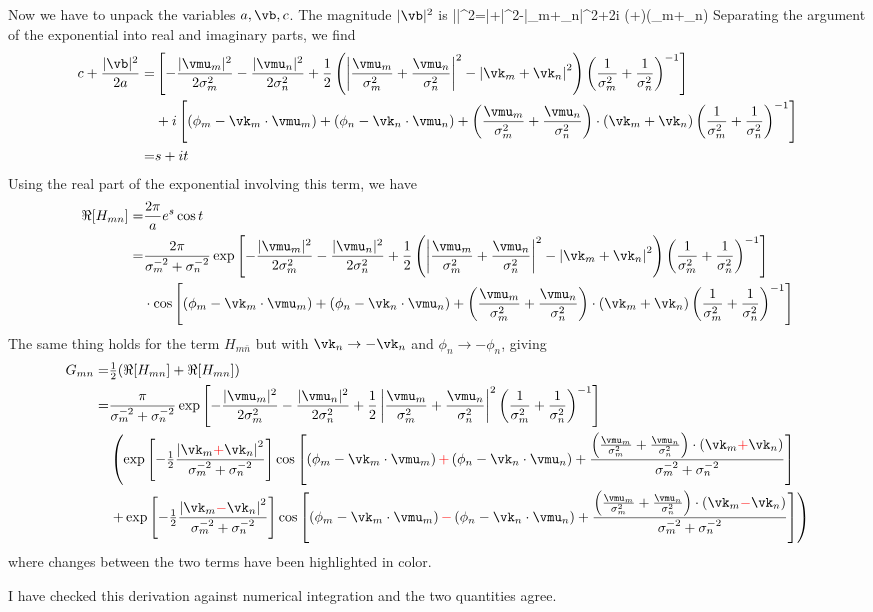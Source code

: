 \documentclass[12pt]{article}
\begin{document}
Now we have to unpack the variables $a,\vb,c$. The magnitude $|\vb|^2$ is
\be
|\vb|^2=\left|+\right|^2-\left|\vk_m+\vk_n\right|^2+2i \left(+\right)\cdot\left(\vk_m+\vk_n\right)
\ee
Separating the argument of the exponential into real and imaginary parts, we find
\begin{align}
c+\frac{|\vb|^2}{2a}=&\left[-\frac{|\vmu_m|^2}{2\sigma_m^2}-\frac{|\vmu_n|^2}{2\sigma_n^2}
+\frac{1}{2}\left(\left|\frac{\vmu_m}{\sigma_m^2}+\frac{\vmu_n}{\sigma_n^2}\right|^2
-\left|\vk_m+\vk_n\right|^2\right)\left(\frac{1}{\sigma_m^2}+\frac{1}{\sigma_n^2}\right)^{-1}\right]\\
&+i\left[\left(\phi_m-\vk_m\cdot\vmu_m\right)+\left(\phi_n-\vk_n\cdot\vmu_n\right)+\left(\frac{\vmu_m}{\sigma_m^2}+\frac{\vmu_n}{\sigma_n^2}\right)\cdot\left(\vk_m+\vk_n\right)\left(\frac{1}{\sigma_m^2}+\frac{1}{\sigma_n^2}\right)^{-1}\right]\\
=&s+it
\end{align}
Using the real part of the exponential involving this term, we have
\begin{align}
\Re[H_{mn}]=&\frac{2\pi}{a}e^s\cos{t}\\
=&\frac{2\pi}{\sigma_m^{-2}+\sigma_n^{-2}}\exp{\left[-\frac{|\vmu_m|^2}{2\sigma_m^2}-\frac{|\vmu_n|^2}{2\sigma_n^2}
+\frac{1}{2}\left(\left|\frac{\vmu_m}{\sigma_m^2}+\frac{\vmu_n}{\sigma_n^2}\right|^2
-\left|\vk_m+\vk_n\right|^2\right)\left(\frac{1}{\sigma_m^2}+\frac{1}{\sigma_n^2}\right)^{-1}\right]}\\
&\cdot\cos{\left[\left(\phi_m-\vk_m\cdot\vmu_m\right)+\left(\phi_n-\vk_n\cdot\vmu_n\right)+\left(\frac{\vmu_m}{\sigma_m^2}+\frac{\vmu_n}{\sigma_n^2}\right)\cdot\left(\vk_m+\vk_n\right)\left(\frac{1}{\sigma_m^2}+\frac{1}{\sigma_n^2}\right)^{-1}\right]}
\end{align}
The same thing holds for the term $H_{m\bar{n}}$ but with $\vk_n\to-\vk_n$ and $\phi_n\to-\phi_n$, giving
\begin{align}
G_{mn}=&\tfrac{1}{2}(\Re[H_{mn}]+\Re[H_{mn}])\\
=&\frac{\pi}{\sigma_m^{-2}+\sigma_n^{-2}}\exp{\left[-\frac{|\vmu_m|^2}{2\sigma_m^2}-\frac{|\vmu_n|^2}{2\sigma_n^2}
+\frac{1}{2}\left|\frac{\vmu_m}{\sigma_m^2}+\frac{\vmu_n}{\sigma_n^2}\right|^2 \left(\frac{1}{\sigma_m^2}+\frac{1}{\sigma_n^2}\right)^{-1}\right]}\\
&\left(
\exp{\left[
-\tfrac{1}{2}\frac{\left|\vk_m{\color{red}+}\vk_n\right|^2}{\sigma_m^{-2}+\sigma_n^{-2}}
\right]}
\cos{\left[
\left(\phi_m-\vk_m\cdot\vmu_m\right){\color{red}+}\left(\phi_n-\vk_n\cdot\vmu_n\right)+\frac{\left(\frac{\vmu_m}{\sigma_m^2}+\frac{\vmu_n}{\sigma_n^2}\right)\cdot\left(\vk_m{\color{red}+}\vk_n\right)}
{\sigma_m^{-2}+\sigma_n^{-2}}
\right]}
\right.\\
&\left.
+\exp{\left[
-\tfrac{1}{2}\frac{\left|\vk_m{\color{red}-}\vk_n\right|^2}{\sigma_m^{-2}+\sigma_n^{-2}}
\right]}
\cos{\left[
\left(\phi_m-\vk_m\cdot\vmu_m\right){\color{red}-}\left(\phi_n-\vk_n\cdot\vmu_n\right)+\frac{\left(\frac{\vmu_m}{\sigma_m^2}+\frac{\vmu_n}{\sigma_n^2}\right)\cdot\left(\vk_m{\color{red}-}\vk_n\right)}
{\sigma_m^{-2}+\sigma_n^{-2}}
\right]}
\right)
\end{align}
where changes between the two terms have been highlighted in color.

I have checked this derivation against numerical integration and the two quantities agree.
\end{document}
